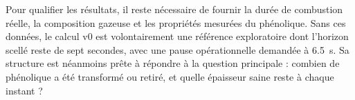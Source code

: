 \documentclass[oneside,openany]{amsdtx}
\begin{document}
Pour qualifier les résultats, il reste nécessaire de fournir la durée de combustion réelle,
la composition gazeuse et les propriétés mesurées du phénolique. Sans ces
données, le calcul v0 est volontairement une référence
exploratoire dont l'horizon scellé reste de sept secondes, avec une pause
opérationnelle demandée à \SI{6.5}{s}. Sa structure est néanmoins prête à répondre à
la question principale : combien de phénolique a été transformé ou retiré, et
quelle épaisseur saine reste à chaque instant ?
\end{document}
